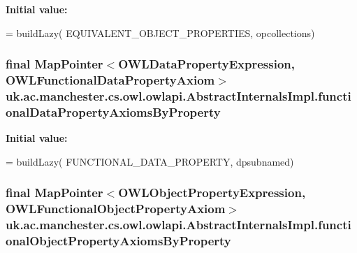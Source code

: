 {\bfseries Initial value\-:}
\begin{DoxyCode}
= buildLazy(
            EQUIVALENT\_OBJECT\_PROPERTIES, opcollections)
\end{DoxyCode}
\hypertarget{classuk_1_1ac_1_1manchester_1_1cs_1_1owl_1_1owlapi_1_1_abstract_internals_impl_a368fa68dc04ec102a6cef2d2343f8ae6}{
\subsubsection[{functional\-Data\-Property\-Axioms\-By\-Property}]{\setlength{\rightskip}{0pt plus 5cm}final Map\-Pointer$<${\bf O\-W\-L\-Data\-Property\-Expression}, {\bf O\-W\-L\-Functional\-Data\-Property\-Axiom}$>$ uk.\-ac.\-manchester.\-cs.\-owl.\-owlapi.\-Abstract\-Internals\-Impl.\-functional\-Data\-Property\-Axioms\-By\-Property\hspace{0.3cm}{\ttfamily [protected]}}}\label{classuk_1_1ac_1_1manchester_1_1cs_1_1owl_1_1owlapi_1_1_abstract_internals_impl_a368fa68dc04ec102a6cef2d2343f8ae6}
{\bfseries Initial value\-:}
\begin{DoxyCode}
= buildLazy(
            FUNCTIONAL\_DATA\_PROPERTY, dpsubnamed)
\end{DoxyCode}
\hypertarget{classuk_1_1ac_1_1manchester_1_1cs_1_1owl_1_1owlapi_1_1_abstract_internals_impl_a05fca5eb6e3121d35d72afda6782ddec}{
\subsubsection[{functional\-Object\-Property\-Axioms\-By\-Property}]{\setlength{\rightskip}{0pt plus 5cm}final Map\-Pointer$<${\bf O\-W\-L\-Object\-Property\-Expression}, {\bf O\-W\-L\-Functional\-Object\-Property\-Axiom}$>$ uk.\-ac.\-manchester.\-cs.\-owl.\-owlapi.\-Abstract\-Internals\-Impl.\-functional\-Object\-Property\-Axioms\-By\-Property\hspace{0.3cm}{\ttfamily [protected]}}}\label{classuk_1_1ac_1_1manchester_1_1cs_1_1owl_1_1owlapi_1_1_abstract_internals_impl_a05fca5eb6e3121d35d72afda6782ddec}
